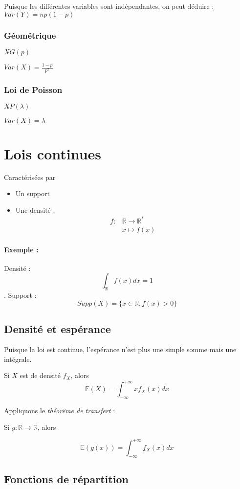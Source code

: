\documentclass{article}
\begin{document}
Puisque les différentes variables sont indépendantes, on peut déduire :
$Var(Y) = np(1-p)$

\subsubsection{Géométrique}
$X \tilde{} G(p)$

$Var(X) = \frac{1-p}{p^2}$

\subsubsection{Loi de Poisson}
$X \tilde{} P(\lambda)$

$Var(X) = \lambda$

\section{Lois continues}

Caractérisées par
\begin{itemize}
  \item Un support
  \item Une densité :
  \begin{align*}
    f: &\mathbb{R} \to \mathbb{R}^{*} \\
    &x \mapsto f(x)
  \end{align*}
\end{itemize}

\paragraph{Exemple :}
Densité : $$ \int_{\mathbb{R}} f(x)dx = 1 $$.
Support : $$ Supp(X) = \{ x \in \mathbb{R}, f(x) > 0 \}$$

\subsection{Densité et espérance}
Puisque la loi est continue, l'espérance n'est plus une simple somme mais une
intégrale.

Si $X$ est de densité $f_{X}$, alors $$\mathbb{E}(X) = \int_{- \infty}^{+ \infty} x f_{X}(x) dx$$

Appliquons le \textit{théorême de transfert} :

Si $g : \mathbb{R} \to \mathbb{R}$, alors

$$\mathbb{E}(g(x)) = \int_{- \infty}^{+ \infty} f_{X}(x)dx $$

\subsection{Fonctions de répartition}
\end{document}
